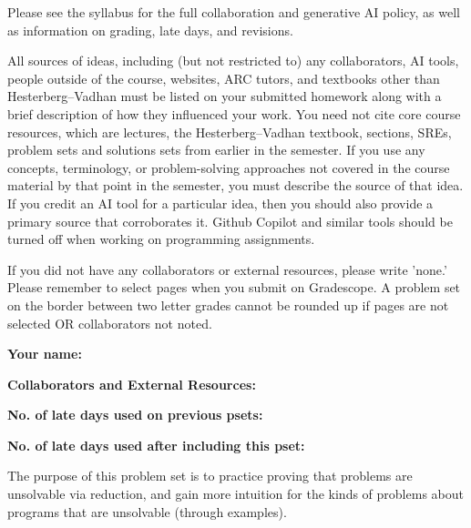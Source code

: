 \documentclass[11pt]{article}
\begin{document}

Please see the syllabus for the full collaboration and generative AI policy, as well as information on grading, late days, and revisions.

All sources of ideas, including (but not restricted to) any collaborators, AI tools, people outside of the course, websites, ARC tutors, and textbooks other than Hesterberg--Vadhan must be listed on your submitted homework along with a brief description of how they influenced your work. You need not cite core course resources, which are lectures, the Hesterberg--Vadhan textbook, sections, SREs, problem sets and solutions sets from earlier in the semester. If you use any concepts, terminology, or problem-solving approaches not covered in the course material by that point in the semester, you must describe the source of that idea. If you credit an AI tool for a particular idea, then you should also provide a primary source that corroborates it. Github Copilot and similar tools should be turned off when working on programming assignments.

If you did not have any collaborators or external resources, please write 'none.' Please remember to select pages when you submit on Gradescope. A problem set on the border between two letter grades cannot be rounded up if pages are not selected OR collaborators not noted.

\vspace{1em}


\textbf{Your name: }

\textbf{Collaborators and External Resources:}

\textbf{No. of late days used on previous psets: }

\textbf{No. of late days used after including this pset: }

\vspace{0.2in}

\noindent The purpose of this problem set is to practice proving that problems are unsolvable via reduction, and gain more intuition for the kinds of problems about programs that are unsolvable (through examples).
\end{document}
